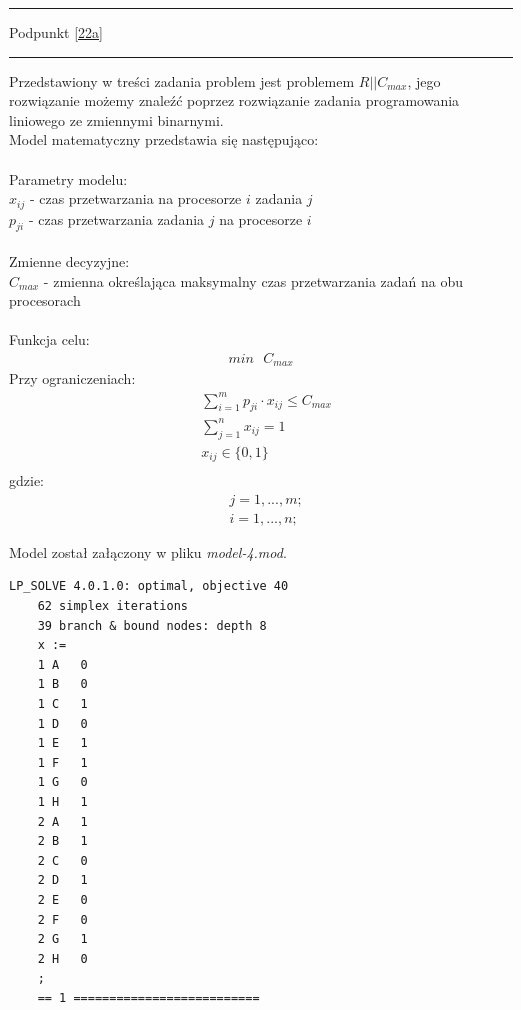 \documentclass[
    12pt, %
]{../fphw}
\begin{document}
\par\noindent\rule{\textwidth}{0.4pt}
Podpunkt \ref{22a}
\par\noindent\rule{\textwidth}{0.4pt}
Przedstawiony w treści zadania problem jest problemem \(R||C_{max}\),
jego rozwiązanie możemy znaleźć poprzez rozwiązanie zadania programowania liniowego
ze zmiennymi binarnymi. \\
Model matematyczny przedstawia się następująco: \\ \\
Parametry modelu: \\
\(x_{ij}\) - czas przetwarzania na procesorze \(i\) zadania \(j\) \\
\(p_{ji}\) - czas przetwarzania zadania \(j\) na procesorze \(i\) \\ \\
Zmienne decyzyjne: \\
\(C_{max}\) - zmienna określająca maksymalny czas przetwarzania zadań na obu procesorach \\ \\
Funkcja celu: \\
\begin{align*}
    min \text{ } C_{max}
\end{align*}
Przy ograniczeniach: \\
\begin{align*}
     & \sum^m_{i=1} p_{ji} \cdot x_{ij} \leq C_{max} \\
     & \sum^n_{j=1} x_{ij} = 1                       \\
     & x_{ij} \in  \{0,1\}                           \\
\end{align*}
gdzie:
\begin{align*}
     & j = 1, ..., m; \\
     & i = 1, ..., n;
\end{align*}

\newpage

Model został załączony w pliku \textit{model-4.mod}.


\begin{lstlisting}[caption=Rozwiązanie znalezione solwerem lpsolve]
    LP_SOLVE 4.0.1.0: optimal, objective 40
    62 simplex iterations
    39 branch & bound nodes: depth 8
    x :=
    1 A   0
    1 B   0
    1 C   1
    1 D   0
    1 E   1
    1 F   1
    1 G   0
    1 H   1
    2 A   1
    2 B   1
    2 C   0
    2 D   1
    2 E   0
    2 F   0
    2 G   1
    2 H   0
    ;
    == 1 ==========================  
\end{lstlisting}
\end{document}
